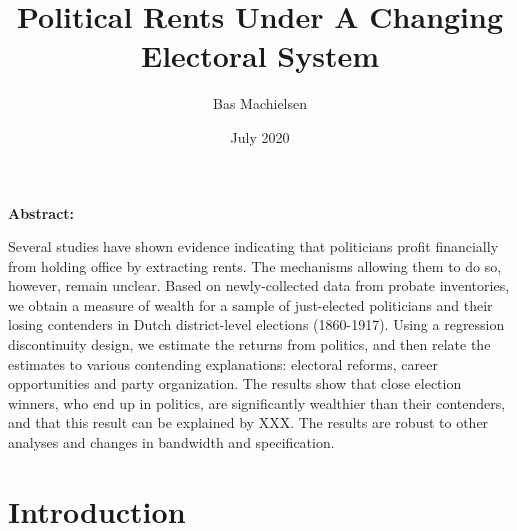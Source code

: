 \documentclass[12pt]{article}
\title{\textbf{Political Rents Under A Changing Electoral System}}
\author{Bas Machielsen}
\date{July 2020}
\begin{document}
\maketitle

\begin{center} \textbf{Abstract:} \end{center}

 Several studies have shown evidence indicating that politicians profit financially from holding office by extracting rents. The mechanisms allowing them to do so, however, remain unclear. Based on newly-collected data from probate inventories, we obtain a measure of wealth for a sample of just-elected politicians and their losing contenders in Dutch district-level elections (1860-1917). Using a regression discontinuity design, we estimate the returns from politics, and then relate the estimates to various contending explanations: electoral reforms, career opportunities and party organization. The results show that close election winners, who end up in politics, are significantly wealthier than their contenders, and that this result can be explained by XXX. The results are robust to other analyses and changes in bandwidth and specification. 

\clearpage

\section{Introduction}
\end{document}
